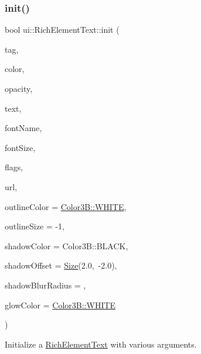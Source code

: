 \subsubsection{\texorpdfstring{init()}{init()}\hspace{0.1cm}{\footnotesize\ttfamily [1/2]}}
{\footnotesize\ttfamily bool ui\+::\+Rich\+Element\+Text\+::init (\begin{DoxyParamCaption}\item[{int}]{tag,  }\item[{const \hyperlink{structColor3B}{Color3B} \&}]{color,  }\item[{G\+Lubyte}]{opacity,  }\item[{const std\+::string \&}]{text,  }\item[{const std\+::string \&}]{font\+Name,  }\item[{float}]{font\+Size,  }\item[{uint32\+\_\+t}]{flags,  }\item[{const std\+::string \&}]{url,  }\item[{const \hyperlink{structColor3B}{Color3B} \&}]{outline\+Color = {\ttfamily \hyperlink{structColor3B_adf57cb86ca15f434b29215ad471cdc35}{Color3\+B\+::\+W\+H\+I\+TE}},  }\item[{int}]{outline\+Size = {\ttfamily -\/1},  }\item[{const \hyperlink{structColor3B}{Color3B} \&}]{shadow\+Color = {\ttfamily Color3B\+:\+:BLACK},  }\item[{const cocos2d\+::\+Size \&}]{shadow\+Offset = {\ttfamily \hyperlink{classSize}{Size}(2.0,~-\/2.0)},  }\item[{int}]{shadow\+Blur\+Radius = {},  }\item[{const \hyperlink{structColor3B}{Color3B} \&}]{glow\+Color = {\ttfamily \hyperlink{structColor3B_adf57cb86ca15f434b29215ad471cdc35}{Color3\+B\+::\+W\+H\+I\+TE}} }\end{DoxyParamCaption})}



Initialize a \hyperlink{classui_1_1RichElementText}{Rich\+Element\+Text} with various arguments. 


